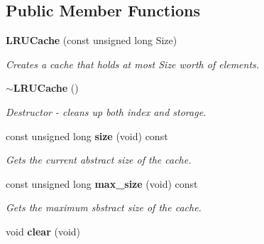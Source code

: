 \subsection*{Public Member Functions}
\begin{DoxyCompactItemize}
\item 
{\bf LRUCache} (const unsigned long Size)
\begin{DoxyCompactList}\small\item\em Creates a cache that holds at most Size worth of elements. \item\end{DoxyCompactList}\item 
{\bf $\sim$LRUCache} ()\label{classLRUCache_a64ae7e7d3ea41f536abcd7c40033d2a5}

\begin{DoxyCompactList}\small\item\em Destructor -\/ cleans up both index and storage. \item\end{DoxyCompactList}\item 
const unsigned long {\bf size} (void) const 
\begin{DoxyCompactList}\small\item\em Gets the current abstract size of the cache. \item\end{DoxyCompactList}\item 
const unsigned long {\bf max\_\-size} (void) const 
\begin{DoxyCompactList}\small\item\em Gets the maximum sbstract size of the cache. \item\end{DoxyCompactList}\item 
void {\bf clear} (void)\label{classLRUCache_ad59b44b509fcef46b3666695c5e4a1aa}


\end{DoxyCompactItemize}
